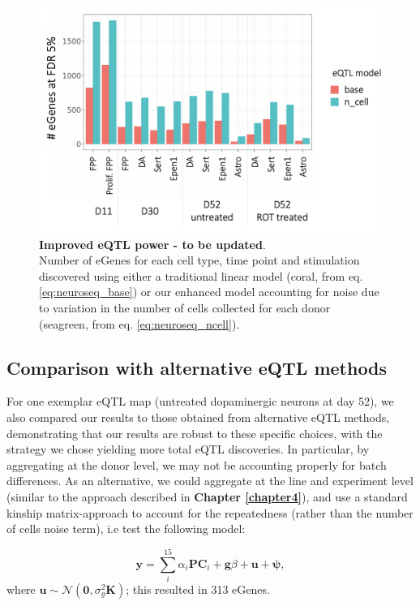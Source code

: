 \begin{figure}[h]
\centering
\includegraphics[width=13cm]{Chapter5/Fig/neuroseq_eqtl_power.png}
\caption[Improved eQTL power]{\textbf{Improved eQTL power - to be updated}.\\
Number of eGenes for each cell type, time point and stimulation discovered using either a traditional linear model (coral, from eq. \eqref{eq:neuroseq_base}) or our enhanced model accounting for noise due to variation in the number of cells collected for each donor (seagreen, from eq. \eqref{eq:neuroseq_ncell}).}
\label{fig:neuroseq_eqtl_improved_power}
\end{figure}


\subsection{Comparison with alternative eQTL methods}

For one exemplar eQTL map (untreated dopaminergic neurons at day 52), we also compared our results to those obtained from alternative eQTL methods, demonstrating that our results are robust to these specific choices, with the strategy we chose yielding more total eQTL discoveries. 
In particular, by aggregating at the donor level, we may not be accounting properly for batch differences.
As an alternative, we could aggregate at the line and experiment level (similar to the approach described in \textbf{Chapter 
\ref{chapter4}}), and use a standard kinship matrix-approach to account for the repeatedness (rather than the number of cells noise term), i.e test the following model:

\begin{equation}\label{eq:neuroseq_pcs_kinship}
    \mathbf{y} = \sum_i^{15}\alpha_i \mathbf{PC}_i + \mathbf{g}\beta + \mathbf{u} + \boldsymbol{\psi}, 
\end{equation}
where $ \mathbf{u} \sim \mathcal{N}(\mathbf{0},\sigma_g^2\mathbf{K})$;
this resulted in 313 eGenes.\\

